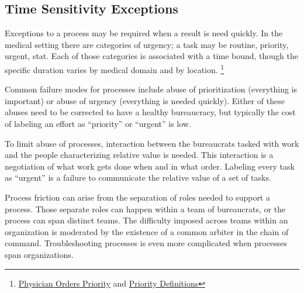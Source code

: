 \subsection*{Time Sensitivity Exceptions}
Exceptions to a process may be required when a result is need quickly. In the medical setting there are categories of urgency; a task may be routine, priority, urgent, stat. 
Each of those categories is associated with a time bound, though the specific duration varies by medical domain and by location.
\footnote{\href{http://docport.columbia-stmarys.org/EHR/PhysicianOrdersPriorityandDeptServiceHours.aspx}{Physician Orders Priority} and \href{https://www.unitypoint.org/peoria/services-priority-definitions-and-critical-values.aspx}{Priority Definitions}}

Common failure modes for processes include abuse of prioritization (everything is important) or abuse of urgency (everything is needed quickly). Either of these abuses need to be corrected to have a healthy bureaucracy, but typically the cost of labeling an effort as ``priority'' or ``urgent'' is low. 

To limit abuse of processes, interaction between the bureaucrats tasked with work and the people characterizing relative value is needed. This interaction is a negotiation of what work gets done when and in what order. Labeling every task as ``urgent'' is a failure to communicate the relative value of a set of tasks.


Process friction can arise from the separation of roles needed to support a process. Those separate roles can happen within a team of bureaucrats, or the process can span distinct teams. The difficulty imposed across teams within an organization is moderated by the existence of a common arbiter in the chain of command.  
Troubleshooting processes is even more complicated when processes span organizations.  